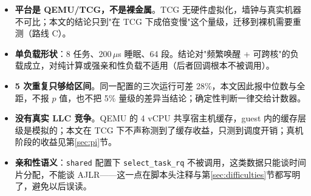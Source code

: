 \begin{itemize}
  \item \textbf{平台是 QEMU/TCG，不是裸金属}。TCG 无硬件虚拟化，墙钟与真实机器不可比；本文的结论只到"在 TCG 下成倍变慢"这个量级，迁移到裸机需要重测（路线 C）。
  \item \textbf{单负载形状}：8 任务、200\,$\mu$s 睡眠、64 段。结论对"频繁唤醒 + 可跨核"的负载成立，对纯计算或强亲和性负载不适用（后者回调根本不被调用）。
  \item \textbf{5 次重复只够给区间}。同一配置的三次运行可差 28\%，本文因此报中位数与全距，不报 $p$ 值，也不把 5\% 量级的差异当结论；确定性判断一律交给计数器。
  \item \textbf{没有真实 LLC 竞争}。QEMU 的 4 vCPU 共享宿主机缓存，guest 内的缓存层级是模拟的；本文在 TCG 下不声称测到了缓存收益，只测到调度开销；真机阶段的收益见第\ref{sec:pi}节。
  \item \textbf{亲和性语义}：\texttt{shared} 配置下 \texttt{select\_task\_rq} 不被调用，这类数据只能谈时间片分配，不能谈 AJLR——这一点在脚本头注释与第\ref{sec:difficulties}节都写明了，避免以后误读。
\end{itemize}